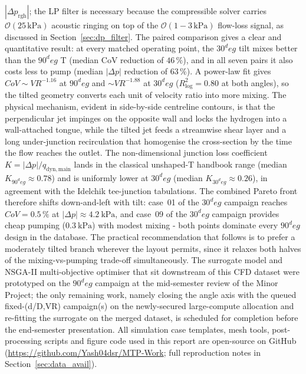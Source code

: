 \documentclass[11pt,a4paper]{article}
\def\dD{d/D}%
\def\VR{VR}%
\def\CoV{CoV}%
\def\circ{ deg}%
\newcommand{\dD}{\ensuremath{d/D}}
\newcommand{\VR}{\ensuremath{\mathrm{VR}}}
\newcommand{\CoV}{\ensuremath{\mathrm{CoV}}}
\begin{document}
\(|\Delta p_{\mathrm{rgh}}|\); the LP filter is necessary because
the compressible solver carries
\(\mathcal{O}(25\,\si{\kilo\pascal})\) acoustic ringing on top of
the \(\mathcal{O}(1\!-\!3\,\si{\kilo\pascal})\) flow-loss signal,
as discussed in Section~\ref{sec:dp_filter}. The paired comparison
gives a clear and quantitative result: at every matched operating
point, the \(30^\circ\) tilt mixes better than the \(90^\circ\) T
(median \CoV{} reduction of \(46\,\%\)), and in all seven pairs it
also costs less to pump (median \(|\Delta p|\) reduction of
\(63\,\%\)). A power-law fit gives \(\CoV \sim \VR^{-1.16}\) at
\(90^\circ\) and \(\sim \VR^{-1.88}\) at \(30^\circ\)
(\(R^2_{\log} = 0.80\) at both angles), so the tilted geometry
converts each unit of velocity ratio into more mixing. The physical
mechanism, evident in side-by-side centreline contours, is that the
perpendicular jet impinges on the opposite wall and locks the
hydrogen into a wall-attached tongue, while the tilted jet feeds a
streamwise shear layer and a long under-junction recirculation that
homogenise the cross-section by the time the flow reaches the
outlet. The non-dimensional junction loss coefficient
\(K = |\Delta p|/q_{\mathrm{dyn,main}}\) lands in the classical
unshaped-T handbook range (median \(K_{90^\circ}\!\approx 0.78\)) and
is uniformly lower at \(30^\circ\) (median \(K_{30^\circ}\!\approx
0.26\)), in agreement with the Idelchik tee-junction tabulations.
The combined Pareto front therefore shifts down-and-left with
tilt: case~01 of the \(30^\circ\) campaign reaches \(\CoV = 0.5\,\%\)
at \(|\Delta p|\!\approx\SI{4.2}{\kilo\pascal}\), and case~09 of
the \(30^\circ\) campaign provides cheap pumping
(\(\SI{0.3}{\kilo\pascal}\)) with modest mixing - both points
dominate every \(90^\circ\) design in the database. The practical
recommendation that follows is to prefer a moderately tilted branch
wherever the layout permits, since it relaxes both halves of the
mixing-vs-pumping trade-off simultaneously. The surrogate model
and NSGA-II multi-objective optimiser that sit downstream of this
CFD dataset were prototyped on the \(90^\circ\) campaign at the
mid-semester review of the Minor Project; the only remaining
work, namely closing the angle axis with the queued
fixed-(\dD,\VR) campaign(s) on the newly-secured large-compute
allocation and re-fitting the surrogate on the merged dataset,
is scheduled for completion before the end-semester
presentation. All simulation case templates, mesh tools,
post-processing scripts and figure code used in this report are
open-source on GitHub (\url{https://github.com/Yash04dsr/MTP-Work};
full reproduction notes in Section~\ref{sec:data_avail}).
\end{document}
